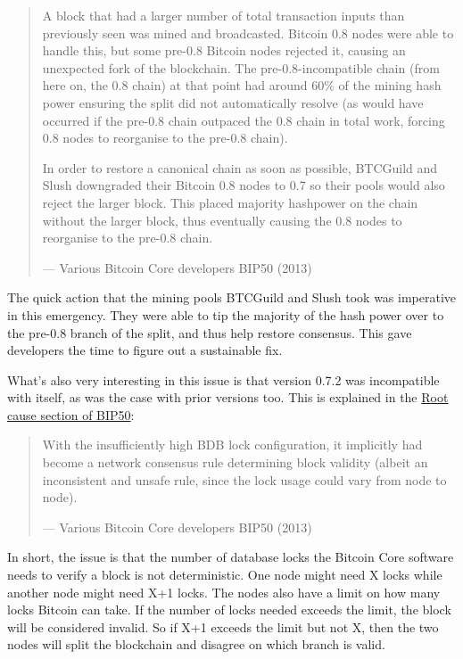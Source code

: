 \begin{quote}
A block that had a larger number of total transaction inputs than
previously seen was mined and broadcasted. Bitcoin 0.8 nodes were able
to handle this, but some pre-0.8 Bitcoin nodes rejected it, causing an
unexpected fork of the blockchain. The pre-0.8-incompatible chain (from
here on, the 0.8 chain) at that point had around 60\% of the mining hash
power ensuring the split did not automatically resolve (as would have
occurred if the pre-0.8 chain outpaced the 0.8 chain in total work,
forcing 0.8 nodes to reorganise to the pre-0.8 chain).

In order to restore a canonical chain as soon as possible, BTCGuild and
Slush downgraded their Bitcoin 0.8 nodes to 0.7 so their pools would
also reject the larger block. This placed majority hashpower on the
chain without the larger block, thus eventually causing the 0.8 nodes to
reorganise to the pre-0.8 chain.

---  Various Bitcoin Core developers BIP50 (2013)
\end{quote}

The quick action that the mining pools BTCGuild and Slush took was
imperative in this emergency. They were able to tip the majority of the
hash power over to the pre-0.8 branch of the split, and thus help
restore consensus. This gave developers the time to figure out a
sustainable fix.

What's also very interesting in this issue is that version 0.7.2 was
incompatible with itself, as was the case with prior versions too. This
is explained in the
\href{https://github.com/bitcoin/bips/blob/master/bip-0050.mediawiki\#root-cause}{Root
cause section of BIP50}:

\begin{quote}
With the insufficiently high BDB lock configuration, it implicitly had
become a network consensus rule determining block validity (albeit an
inconsistent and unsafe rule, since the lock usage could vary from node
to node).

---  Various Bitcoin Core developers BIP50 (2013)
\end{quote}

In short, the issue is that the number of database locks the Bitcoin
Core software needs to verify a block is not deterministic. One node
might need X locks while another node might need X+1 locks. The nodes
also have a limit on how many locks Bitcoin can take. If the number of
locks needed exceeds the limit, the block will be considered invalid. So
if X+1 exceeds the limit but not X, then the two nodes will split the
blockchain and disagree on which branch is valid.

